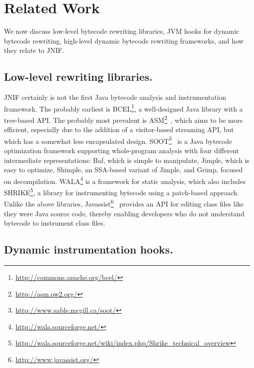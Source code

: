 \section{Related Work}\label{sec:jnif-relatedwork}

We now discuss low-level \java{} bytecode rewriting libraries,
JVM hooks for dynamic bytecode rewriting,
high-level dynamic bytecode rewriting frameworks,
and how they relate to JNIF.
 
\subsection*{Low-level rewriting libraries.}

JNIF certainly is not the first Java bytecode analysis and instrumentation framework.
The probably earliest is BCEL\footnote{\url{http://commons.apache.org/bcel/}},
a well-designed Java library with a tree-based API.
The probably most prevalent is ASM\footnote{\url{http://asm.ow2.org/}}~\citep{brunetonASMCodeManipulation2002,kuleshovUsingASMFramework2007},
which aims to be more efficient, especially due to the addition of a visitor-based streaming API, 
but which has a somewhat less encapsulated design.
SOOT\footnote{\url{http://www.sable.mcgill.ca/soot/}}~\citep{vallee-raiSootJavaBytecode1999}
is a Java bytecode optimization framework supporting whole-program analysis
with four different intermediate representations:
Baf, which is simple to manipulate,
Jimple, which is easy to optimize, 
Shimple, an SSA-based variant of Jimple, and
Grimp, focused on decompilation. 
%
WALA\footnote{\url{http://wala.sourceforge.net/}} is a framework for static analysis, 
which also includes SHRIKE\footnote{\url{http://wala.sourceforge.net/wiki/index.php/Shrike_technical_overview}}, 
a library for instrumenting bytecode using a patch-based approach.
%
Unlike the above libraries, 
Javassist\footnote{\url{http://www.javassist.org/}}~\cite{chibaEasytoUseToolkitEfficient2003}
provides an API for editing class files like they were Java source code,
thereby enabling developers who do not understand bytecode to instrument class files.

\subsection*{Dynamic instrumentation hooks.}

